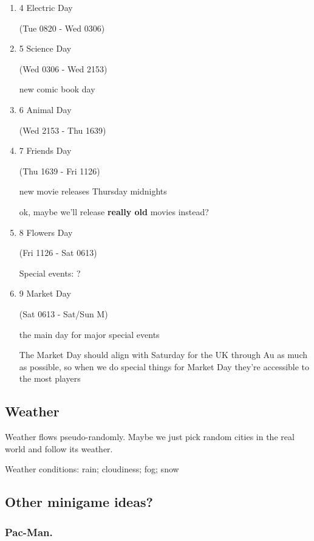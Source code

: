 \documentclass[11pt]{article}
\begin{document}
\begin{enumerate}
\begin{enumerate}
(Mon 1333 - Tue 0820)

New music releases on Mondays

Special events: ?
\item 4 Electric Day
\label{sec-5-1-1-4}

(Tue 0820 - Wed 0306)


\item 5 Science Day
\label{sec-5-1-1-5}

(Wed 0306 - Wed 2153)

new comic book day

\item 6 Animal Day
\label{sec-5-1-1-6}

(Wed 2153 - Thu 1639)


\item 7 Friends Day
\label{sec-5-1-1-7}

(Thu 1639 - Fri 1126)

new movie releases Thursday midnights

ok, maybe we'll release \textbf{really old} movies instead?
\item 8 Flowers Day
\label{sec-5-1-1-8}

(Fri 1126 - Sat 0613)

Special events: ?
\item 9 Market Day
\label{sec-5-1-1-9}

(Sat 0613 - Sat/Sun M)

the main day for major special events

The Market  Day should align  with Saturday for  the UK through  Au as
much as possible, so when we  do special things for Market Day they're
accessible to the most players
\end{enumerate}
\subsection{Weather}
\label{sec-5-2}

Weather flows pseudo-randomly. Maybe we just pick random cities in the
real  world and  follow its  weather. 

Weather conditions: rain; cloudiness; fog; snow
\subsection{Other minigame ideas?}
\label{sec-5-3}

\subsubsection{Pac-Man.}
\label{sec-5-3-1}


\end{enumerate}
\end{document}
